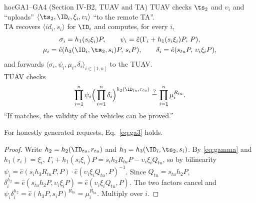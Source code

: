 \begin{stepbox}{hoc}{GA1--GA4 \;(Section IV-B2, TUAV and TA)}
 TUAV checks $\ts_2$ and $\upsilon_i$ and ``uploads'' $\langle\ts_2,\ID_i,\xi_i,\upsilon_i\rangle$ ``to the remote TA''.\\
 TA recovers $\langle id_i,s_i\rangle$ for $\ID_i$ and computes, for every $i$,
\begin{gather*}
\sigma_i=h_1(s_i\xi_i)P,\qquad \psi_i=\hat e(\Gamma_i+h_1(s_i\xi_i)P,\,P),\\
\mu_i=\hat e(h_3(\ID_i,\ts_2,s_i)P,\,s_iP),\qquad \delta_i=\hat e(s_{tu}P,\,\upsilon_i\xi_iP),
\end{gather*}
and forwards $\langle\sigma_i,\psi_i,\mu_i,\delta_i\rangle_{i\in[1,n]}$ to the TUAV.\\
 TUAV checks
\begin{equation}\label{eq:ga3}
\prod_{i=1}^n\psi_i\Big(\prod_{i=1}^n\delta_i\Big)^{h_2(\ID_{tu},r_{tu})}\overset{?}{=}\prod_{i=1}^n\mu_i^{R_{tu}} .
\end{equation}
 ``If matches, the validity of the vehicles can be proved.''
\end{stepbox}

\begin{lemma}\label{lem:ga3}
For honestly generated requests, Eq.~\eqref{eq:ga3} holds.
\end{lemma}
\begin{proof}
Write $h_2=h_2(\ID_{tu},r_{tu})$ and $h_3=h_3(\ID_i,\ts_2,s_i)$. By \eqref{eq:gamma} and $h_1(r_i)=\xi_i$,
$\Gamma_i+h_1(s_i\xi_i)P=s_ih_3R_{tu}P-\upsilon_i\xi_iQ_{tu}$, so by bilinearity
$\psi_i=\hat e(s_ih_3R_{tu}P,P)\cdot\hat e(\upsilon_i\xi_iQ_{tu},P)^{-1}$. Since $Q_{tu}=s_{tu}h_2P$,
$\delta_i^{h_2}=\hat e(s_{tu}h_2P,\upsilon_i\xi_iP)=\hat e(\upsilon_i\xi_iQ_{tu},P)$. The two factors cancel and
$\psi_i\delta_i^{h_2}=\hat e(h_3P,s_iP)^{R_{tu}}=\mu_i^{R_{tu}}$. Multiply over $i$.
\end{proof}

